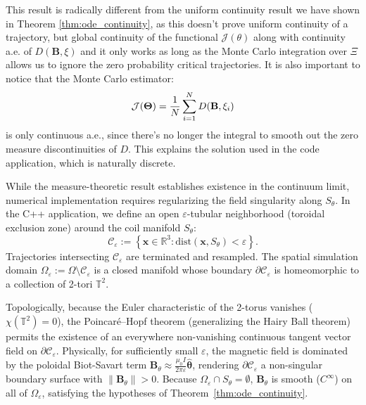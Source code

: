 \documentclass{article}
\begin{document}
	This result is radically different from the uniform continuity result we have shown in Theorem \ref{thm:ode_continuity}, as this doesn't prove uniform continuity of a trajectory, but global continuity of the functional $\mathcal{J}(\theta)$ along with continuity a.e. of $D(\mathbf{B}, \xi)$ and it only works as long as the Monte Carlo integration over $\Xi$ allows us to ignore the zero probability critical trajectories. It is also important to notice that the Monte Carlo estimator:
	\begin{equation}
		\mathcal{J} (\mathbf{\Theta}) = {1 \over N} \sum_{i=1}^N D(\mathbf{B}, \xi_i)
	\end{equation}
	is only continuous a.e., since there's no longer the integral to smooth out the zero measure discontinuities of $D$. This explains the solution used in the code application, which is naturally discrete.
	
	While the measure-theoretic result establishes existence in the continuum limit, numerical implementation requires regularizing the field singularity along $S_\theta$. In the C++ application, we define an open $\varepsilon$-tubular neighborhood (toroidal exclusion zone) around the coil manifold $S_\theta$:
	\begin{equation}
		\mathcal{C}_\varepsilon := \left\{ \mathbf{x} \in \mathbb{R}^3 : \mathrm{dist}(\mathbf{x}, S_\theta) < \varepsilon \right\} .
	\end{equation}
	Trajectories intersecting $\mathcal{C}_\varepsilon$ are terminated and resampled. The spatial simulation domain $\Omega_\varepsilon := \Omega \setminus \mathcal{C}_\varepsilon$ is a closed manifold whose boundary $\partial \mathcal{C}_\varepsilon$ is homeomorphic to a collection of 2-tori $\mathbb{T}^2$. 
	
	Topologically, because the Euler characteristic of the 2-torus vanishes ($\chi(\mathbb{T}^2) = 0$), the Poincaré--Hopf theorem (generalizing the Hairy Ball theorem) permits the existence of an everywhere non-vanishing continuous tangent vector field on $\partial \mathcal{C}_\varepsilon$. Physically, for sufficiently small $\varepsilon$, the magnetic field is dominated by the poloidal Biot-Savart term $\mathbf{B}_\theta \approx \frac{\mu_0 I}{2\pi \varepsilon} \hat{\boldsymbol{\theta}}$, rendering $\partial \mathcal{C}_\varepsilon$ a non-singular boundary surface with $\|\mathbf{B}_\theta\| > 0$. Because $\Omega_\varepsilon \cap S_\theta = \emptyset$, $\mathbf{B}_\theta$ is smooth ($C^\infty$) on all of $\Omega_\varepsilon$, satisfying the hypotheses of Theorem~\ref{thm:ode_continuity}.
	
\end{document}
